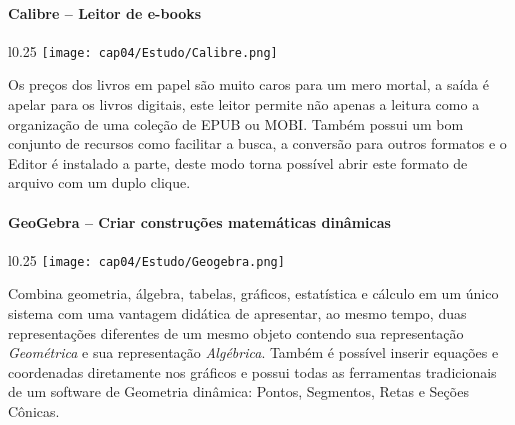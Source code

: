 \paragraph{Calibre – Leitor de e-books}
\begin{minipage}{\linewidth}
 \vspace{5pt}
 \begin{wrapfigure}{l}{0.25\textwidth}
  \vspace{-\baselineskip}
  \texttt{[image: cap04/Estudo/Calibre.png]} 
 \end{wrapfigure}
 Os preços dos livros em papel são muito caros para um mero mortal, a saída é apelar para os livros digitais, este leitor permite não apenas a leitura como a organização de uma coleção de EPUB ou MOBI. Também possui um bom conjunto de recursos como facilitar a busca, a conversão para outros formatos e o Editor é instalado a parte, deste modo torna possível abrir este formato de arquivo com um duplo clique.
\end{minipage}

\paragraph{GeoGebra – Criar construções matemáticas dinâmicas}
\begin{minipage}{\linewidth}
 \vspace{5pt}
 \begin{wrapfigure}{l}{0.25\textwidth}
  \vspace{-\baselineskip}
  \texttt{[image: cap04/Estudo/Geogebra.png]} 
 \end{wrapfigure}
 Combina geometria, álgebra, tabelas, gráficos, estatística e cálculo em um único sistema com uma vantagem didática de apresentar, ao mesmo tempo, duas representações diferentes de um mesmo objeto contendo sua representação \textit{Geométrica} e sua representação \textit{Algébrica}. Também é possível inserir equações e coordenadas diretamente nos gráficos e possui todas as ferramentas tradicionais de um software de Geometria dinâmica: Pontos, Segmentos, Retas e Seções Cônicas.
\end{minipage}

